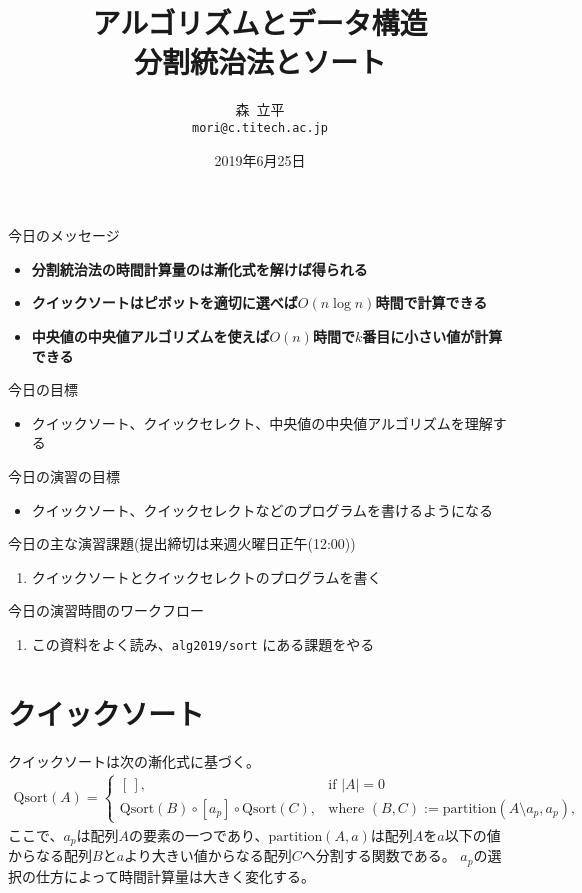 \documentclass[a4paper,twoside,onecolumn,openany,article,10pt]{memoir}
\title{アルゴリズムとデータ構造\\\vspace{.5em} \Large 分割統治法とソート}
\date{2019年6月25日}
\author{森~立平\\ \texttt{mori@c.titech.ac.jp}}
\theoremstyle{remark}
\begin{document}
\maketitle


\noindent
今日のメッセージ
\begin{itemize}
\item \textbf{分割統治法の時間計算量のは漸化式を解けば得られる}
\item \textbf{クイックソートはピボットを適切に選べば$O(n\log n)$時間で計算できる}
\item \textbf{中央値の中央値アルゴリズムを使えば$O(n)$時間で$k$番目に小さい値が計算できる}
\end{itemize}

\noindent
今日の目標
\begin{itemize}
\item クイックソート、クイックセレクト、中央値の中央値アルゴリズムを理解する
\end{itemize}

\noindent
今日の演習の目標
\begin{itemize}
\item クイックソート、クイックセレクトなどのプログラムを書けるようになる
\end{itemize}

\noindent
今日の主な演習課題(提出締切は来週火曜日正午(12:00))
\begin{enumerate}
\item クイックソートとクイックセレクトのプログラムを書く
\end{enumerate}

\noindent
今日の演習時間のワークフロー
\begin{enumerate}
\item この資料をよく読み、\texttt{alg2019/sort} にある課題をやる
\end{enumerate}




\section{クイックソート}
クイックソートは次の漸化式に基づく。
\begin{align*}
\mathrm{Qsort}(A) =
\begin{cases}
[\,],& \text{if } |A| = 0\\
\mathrm{Qsort}(B) \circ [a_p] \circ\mathrm{Qsort}(C),&\text{where }
(B, C) := \mathrm{partition}(A\setminus a_p, a_p),\, 
\end{cases}
\end{align*}
ここで、$a_p$は配列$A$の要素の一つであり、$\mathrm{partition}(A, a)$は配列$A$を$a$以下の値からなる配列$B$と$a$より大きい値からなる配列$C$へ分割する関数である。
$a_p$の選択の仕方によって時間計算量は大きく変化する。
\end{document}
